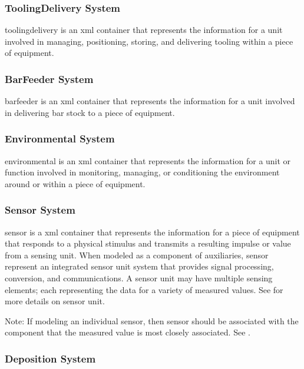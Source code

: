 \subsubsection{ToolingDelivery System}

\gls{toolingdelivery} is an \gls{xml} container that represents the information for a unit involved in managing, positioning, storing, and delivering tooling within a piece of equipment.

\subsubsection{BarFeeder System}

\gls{barfeeder} is an \gls{xml} container that represents the information for a unit involved in delivering bar stock to a piece of equipment.

\subsubsection{Environmental System}

\gls{environmental} is an \gls{xml} container that represents the information for a unit or function involved in monitoring, managing, or conditioning the environment around or within a piece of equipment.

\subsubsection{Sensor System}

\gls{sensor} is a \gls{xml} container that represents the information for a piece of equipment that responds to a physical stimulus and transmits a resulting impulse or value from a sensing unit.   When modeled as a component of \gls{auxiliaries}, sensor \should represent an integrated \gls{sensor unit} system that provides signal processing, conversion, and communications.  A \gls{sensor unit} may have multiple \glspl{sensing element}; each representing the data for a variety of measured values.  See  for more details on \gls{sensor unit}.

\begin{note}
Note: If modeling an individual sensor, then sensor should be associated with the component that the measured value is most closely associated.  See .

\end{note}

\subsubsection{Deposition System}

